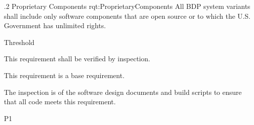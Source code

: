 
\ONERQMTV
{\RqtNumberBase.2}
{Proprietary Components}
{rqt:ProprietaryComponents}
{
All BDP system variants shall include only software components that are open source or to which the U.S. Government has unlimited rights.
}
{
	\item [Phase 1] Threshold
}
{This requirement shall be verified by inspection.}
{
	\item [N/A] This requirement is a base requirement.
}
{
	\item The inspection is of the software design documents and build scripts to ensure that all code meets this requirement.
}
{P1}
